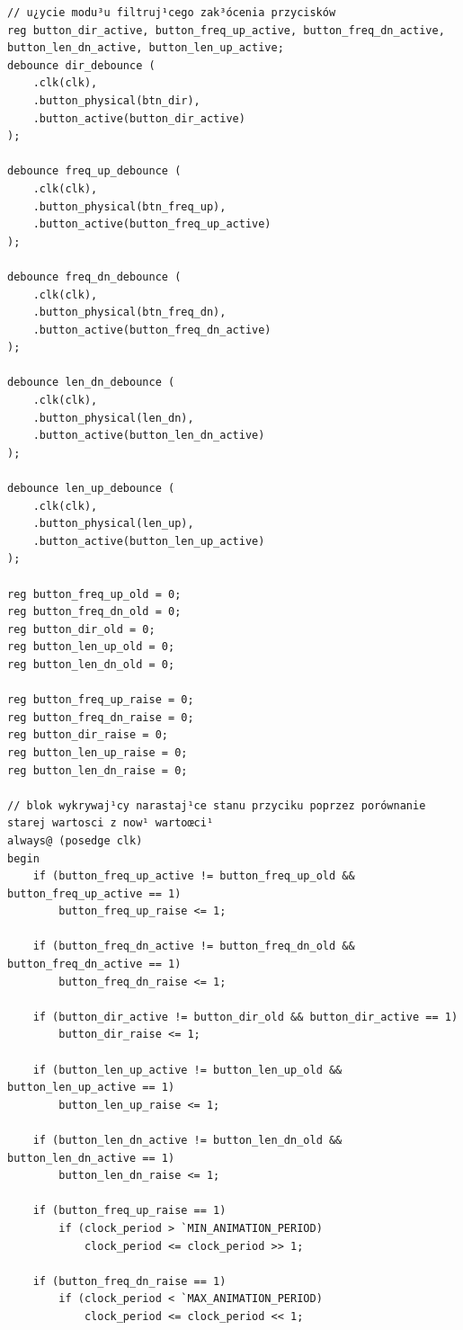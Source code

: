 \documentclass[a4paper]{article}
\begin{document}
\begin{verbatim}
// u¿ycie modu³u filtruj¹cego zak³ócenia przycisków
reg button_dir_active, button_freq_up_active, button_freq_dn_active, button_len_dn_active, button_len_up_active;
debounce dir_debounce ( 
    .clk(clk),
    .button_physical(btn_dir),
    .button_active(button_dir_active)
);

debounce freq_up_debounce ( 
    .clk(clk),
    .button_physical(btn_freq_up),
    .button_active(button_freq_up_active)
);

debounce freq_dn_debounce ( 
    .clk(clk),
    .button_physical(btn_freq_dn),
    .button_active(button_freq_dn_active)
);

debounce len_dn_debounce ( 
    .clk(clk),
    .button_physical(len_dn),
    .button_active(button_len_dn_active)
);

debounce len_up_debounce ( 
    .clk(clk),
    .button_physical(len_up),
    .button_active(button_len_up_active)
);

reg button_freq_up_old = 0;
reg button_freq_dn_old = 0;
reg button_dir_old = 0;
reg button_len_up_old = 0;
reg button_len_dn_old = 0;

reg button_freq_up_raise = 0;
reg button_freq_dn_raise = 0;
reg button_dir_raise = 0;
reg button_len_up_raise = 0;
reg button_len_dn_raise = 0;

// blok wykrywaj¹cy narastaj¹ce stanu przyciku poprzez porównanie starej wartosci z now¹ wartoœci¹
always@ (posedge clk)
begin
    if (button_freq_up_active != button_freq_up_old && button_freq_up_active == 1)
        button_freq_up_raise <= 1;
        
    if (button_freq_dn_active != button_freq_dn_old && button_freq_dn_active == 1)
        button_freq_dn_raise <= 1;
        
    if (button_dir_active != button_dir_old && button_dir_active == 1)
        button_dir_raise <= 1;
        
    if (button_len_up_active != button_len_up_old && button_len_up_active == 1)
        button_len_up_raise <= 1;
        
    if (button_len_dn_active != button_len_dn_old && button_len_dn_active == 1)
        button_len_dn_raise <= 1;
       
    if (button_freq_up_raise == 1)
        if (clock_period > `MIN_ANIMATION_PERIOD)
            clock_period <= clock_period >> 1;
       
    if (button_freq_dn_raise == 1)
        if (clock_period < `MAX_ANIMATION_PERIOD) 
            clock_period <= clock_period << 1;
        

\end{verbatim}
\end{document}
